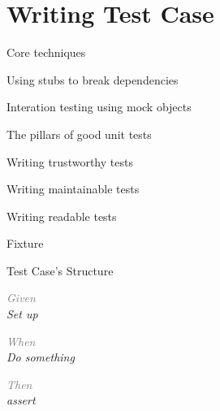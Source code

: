 \documentclass[14pt]{beamer}
\begin{document}
\section{Writing Test Case}
\begin{frame}[plain]{Core techniques}
    \begin{fullpageitemize}
        \item Using stubs to break dependencies
        \item Interation testing using mock objects
    \end{fullpageitemize}
\end{frame}

\begin{frame}[plain]{The pillars of good unit tests}
    \begin{fullpageitemize}
        \item Writing trustworthy tests
        \item Writing maintainable tests
        \item Writing readable tests
    \end{fullpageitemize}
\end{frame}

\begin{frame}[plain]{Fixture}
    \begin{fullpageitemize}
        \item<1-> 
        \item<2-> \color{colorhgray}{Test Class}
        \item<3-> 
        \item<4-> \color{colorhgray}{Test cases}
        \item<5-> 
        \item<6-> \color{colorhgray}{Final test case}
        \item<7-> 
    \end{fullpageitemize}
\end{frame}

\begin{frame}[plain]{Test Case's Structure}
    \begin{fullpageitemize}
        \item<1-> \em{\textcolor{gray}{Given}} \\
            Set up \\

        \item<2-> \em{\textcolor{gray}{When}} \\
            Do something \\

        \item<3-> \em{\textcolor{gray}{Then}} \\
            assert
    \end{fullpageitemize}
\end{frame}
\end{document}
